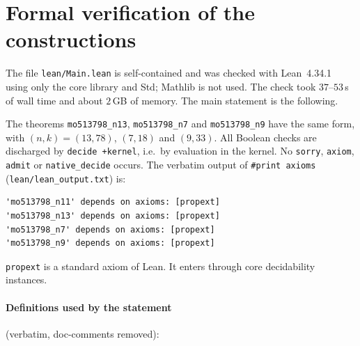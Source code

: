 \section{Formal verification of the constructions}\label{sec:formal}

The file \texttt{lean/Main.lean} is self-contained and was checked with Lean~4.34.1 using only the core
library and Std; Mathlib is not used. The check took $37$--$53$\,s of wall time and about $2$\,GB of
memory. The main statement is the following.



The theorems \texttt{mo513798\_n13}, \texttt{mo513798\_n7} and \texttt{mo513798\_n9} have the same
form, with $(n,k)=(13,78)$, $(7,18)$ and $(9,33)$. All Boolean checks are discharged by
\texttt{decide +kernel}, i.e.\ by evaluation in the kernel. No \texttt{sorry}, \texttt{axiom},
\texttt{admit} or \texttt{native\_decide} occurs. The verbatim output of \texttt{\#print axioms}
(\texttt{lean/lean\_output.txt}) is:
\begin{verbatim}
'mo513798_n11' depends on axioms: [propext]
'mo513798_n13' depends on axioms: [propext]
'mo513798_n7' depends on axioms: [propext]
'mo513798_n9' depends on axioms: [propext]
\end{verbatim}
\texttt{propext} is a standard axiom of Lean. It enters through core decidability instances.

\paragraph{Definitions used by the statement} (verbatim, doc-comments removed):


